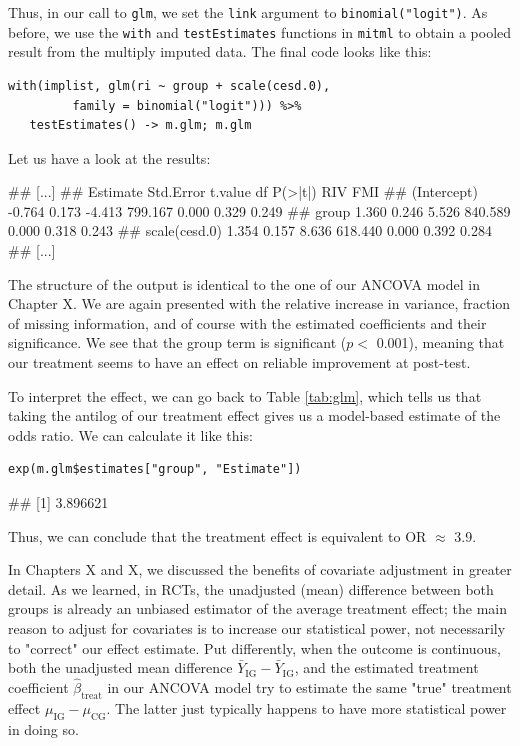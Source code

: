 Thus, in our call to \texttt{glm}, we set the \texttt{link} argument to \texttt{binomial("logit")}. As before, we use the \texttt{with} and \texttt{testEstimates} functions in \texttt{mitml} to obtain a pooled result from the multiply imputed data. The final code looks like this:

\begin{lstlisting}
with(implist, glm(ri ~ group + scale(cesd.0), 
         family = binomial("logit"))) %>% 
   testEstimates() -> m.glm; m.glm
\end{lstlisting}

Let us have a look at the results:

\begin{example}
## [...]
##                Estimate Std.Error t.value      df P(>|t|)   RIV   FMI 
## (Intercept)      -0.764     0.173  -4.413 799.167   0.000 0.329 0.249 
## group             1.360     0.246   5.526 840.589   0.000 0.318 0.243 
## scale(cesd.0)     1.354     0.157   8.636 618.440   0.000 0.392 0.284 
## [...]
\end{example}

The structure of the output is identical to the one of our ANCOVA model in Chapter X. We are again presented with the relative increase in variance, fraction of missing information, and of course with the estimated coefficients and their significance. We see that the group term is significant ($p<$ 0.001), meaning that our treatment seems to have an effect on reliable improvement at post-test. 

To interpret the effect, we can go back to Table \ref{tab:glm}, which tells us that taking the antilog of our treatment effect gives us a model-based estimate of the odds ratio. We can calculate it like this:

\begin{lstlisting}
exp(m.glm$estimates["group", "Estimate"])
\end{lstlisting}

\begin{example}
## [1] 3.896621
\end{example}

Thus, we can conclude that the treatment effect is equivalent to OR $\approx$ 3.9. 

In Chapters X and X, we discussed the benefits of covariate adjustment in greater detail. As we learned, in RCTs, the unadjusted (mean) difference between both groups is already an unbiased estimator of the average treatment effect; the main reason to adjust for covariates is to increase our statistical power, not necessarily to "correct" our effect estimate. Put differently, when the outcome is continuous, both the unadjusted mean difference $\bar Y_{\text{IG}} - \bar Y_{\text{IG}}$, and the estimated treatment coefficient $\hat\beta_{\text{treat}}$ in our ANCOVA model try to estimate the same "true" treatment effect $\mu_{\text{IG}} - \mu_{\text{CG}}$. The latter just typically happens to have more statistical power in doing so.

